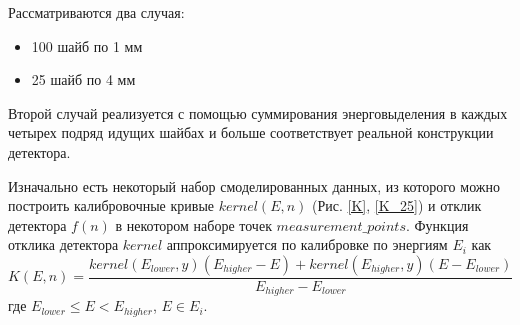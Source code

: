 \documentclass{config}
\begin{document}
Рассматриваются два случая:
\begin{itemize}
    \item 100 шайб по 1 мм
    \item 25 шайб по 4 мм
\end{itemize}
Второй случай реализуется с помощью суммирования энерговыделения в каждых четырех подряд идущих шайбах и больше соответствует реальной конструкции детектора.

Изначально есть некоторый набор смоделированных данных, из которого можно построить калибровочные кривые $kernel(E, n)$ (Рис. \ref{K}, \ref{K_25}) и отклик детектора $f(n)$ в некотором наборе точек $measurement\_points$.
Функция отклика детектора $kernel$ аппроксимируется по калибровке по энергиям ${E_i}$ как
\begin{equation}
    K(E, n) = \frac{kernel(E_{lower}, y) (E_{higher} - E) + kernel(E_{higher}, y) (E - E_{lower})}{E_{higher} - E_{lower}}
\end{equation}
где $E_{lower} \leq E < E_{higher}$, $E \in {E_i}$.
\end{document}

